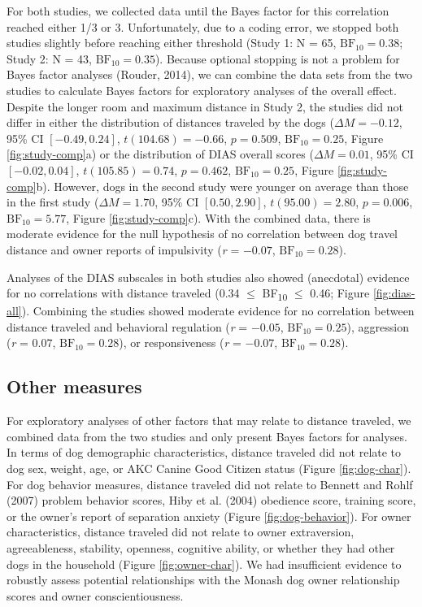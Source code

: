 \documentclass[
  pub,floatsintext]{apa6}
\begin{document}
For both studies, we collected data until the Bayes factor for this correlation reached either 1/3 or 3. Unfortunately, due to a coding error, we stopped both studies slightly before reaching either threshold (Study 1: N = 65, \(\mathrm{BF}_{\textrm{10}} = 0.38\); Study 2: N = 43, \(\mathrm{BF}_{\textrm{10}} = 0.35\)). Because optional stopping is not a problem for Bayes factor analyses (Rouder, 2014), we can combine the data sets from the two studies to calculate Bayes factors for exploratory analyses of the overall effect. Despite the longer room and maximum distance in Study 2, the studies did not differ in either the distribution of distances traveled by the dogs (\(\Delta M = -0.12\), 95\% CI \([-0.49, 0.24]\), \(t(104.68) = -0.66\), \(p = 0.509\), \(\mathrm{BF}_{\textrm{10}} = 0.25\), Figure \ref{fig:study-comp}a) or the distribution of DIAS overall scores (\(\Delta M = 0.01\), 95\% CI \([-0.02, 0.04]\), \(t(105.85) = 0.74\), \(p = 0.462\), \(\mathrm{BF}_{\textrm{10}} = 0.25\), Figure \ref{fig:study-comp}b). However, dogs in the second study were younger on average than those in the first study (\(\Delta M = 1.70\), 95\% CI \([0.50, 2.90]\), \(t(95.00) = 2.80\), \(p = 0.006\), \(\mathrm{BF}_{\textrm{10}} = 5.77\), Figure \ref{fig:study-comp}c). With the combined data, there is moderate evidence for the null hypothesis of no correlation between dog travel distance and owner reports of impulsivity (\emph{r} = \(-0.07\), \(\mathrm{BF}_{\textrm{10}} = 0.28\)).

Analyses of the DIAS subscales in both studies also showed (anecdotal) evidence for no correlations with distance traveled (0.34 \(\leq\) BF\textsubscript{10} \(\leq\) 0.46; Figure \ref{fig:dias-all}). Combining the studies showed moderate evidence for no correlation between distance traveled and behavioral regulation (\emph{r} = \(-0.05\), \(\mathrm{BF}_{\textrm{10}} = 0.25\)), aggression (\emph{r} = \(0.07\), \(\mathrm{BF}_{\textrm{10}} = 0.28\)), or responsiveness (\emph{r} = \(-0.07\), \(\mathrm{BF}_{\textrm{10}} = 0.28\)).

\hypertarget{other-measures}{%
\subsection{Other measures}\label{other-measures}}

For exploratory analyses of other factors that may relate to distance traveled, we combined data from the two studies and only present Bayes factors for analyses. In terms of dog demographic characteristics, distance traveled did not relate to dog sex, weight, age, or AKC Canine Good Citizen status (Figure \ref{fig:dog-char}). For dog behavior measures, distance traveled did not relate to Bennett and Rohlf (2007) problem behavior scores, Hiby et al. (2004) obedience score, training score, or the owner's report of separation anxiety (Figure \ref{fig:dog-behavior}). For owner characteristics, distance traveled did not relate to owner extraversion, agreeableness, stability, openness, cognitive ability, or whether they had other dogs in the household (Figure \ref{fig:owner-char}). We had insufficient evidence to robustly assess potential relationships with the Monash dog owner relationship scores and owner conscientiousness.
\end{document}

